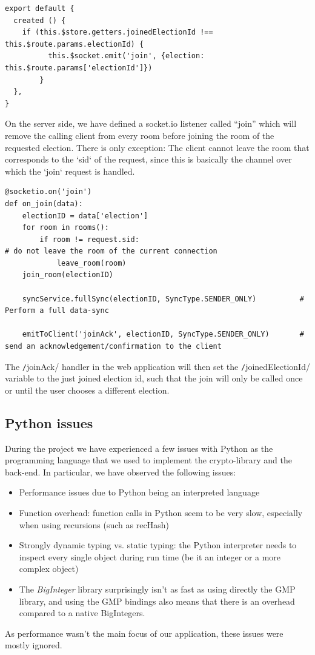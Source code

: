 \begin{verbatim}
export default {
  created () {
    if (this.$store.getters.joinedElectionId !== this.$route.params.electionId) { 
		  this.$socket.emit('join', {election: this.$route.params['electionId']}) 
		}
  },
}
\end{verbatim}
On the server side, we have defined a socket.io listener called "`join"' which will remove the calling client from every room before joining the room of the requested election. There is only exception: The client cannot leave the room that corresponds to the `sid` of the request, since this is basically the channel over which the `join` request is handled.
\begin{verbatim}
@socketio.on('join')
def on_join(data):
    electionID = data['election']
    for room in rooms():
        if room != request.sid:																	# do not leave the room of the current connection
            leave_room(room)
    join_room(electionID)

    syncService.fullSync(electionID, SyncType.SENDER_ONLY)			# Perform a full data-sync

    emitToClient('joinAck', electionID, SyncType.SENDER_ONLY)		# send an acknowledgement/confirmation to the client
\end{verbatim}

The \texttt/joinAck/ handler in the web application will then set the \texttt/joinedElectionId/ variable to the just joined election id, such that the join will only be called once or until the user chooses a different election.

\subsection{Python issues} \label{ssec:PythonIssues}

During the project we have experienced a few issues with Python as the programming language that we used to implement the crypto-library and the back-end. In particular, we have observed the following issues:

\begin{itemize}
	\item Performance issues due to Python being an interpreted language
	\item Function overhead: function calls in Python seem to be very slow, especially when using recursions (such as recHash)
	\item Strongly dynamic typing vs. static typing: the Python interpreter needs to inspect every single object during run time (be it an integer or a more complex object)
	\item The \textit{BigInteger} library surprisingly isn't as fast as using directly the GMP library, and using the GMP bindings also means that there is an overhead compared to a native BigIntegers.
\end{itemize}
As performance wasn't the main focus of our application, these issues were mostly ignored. 

